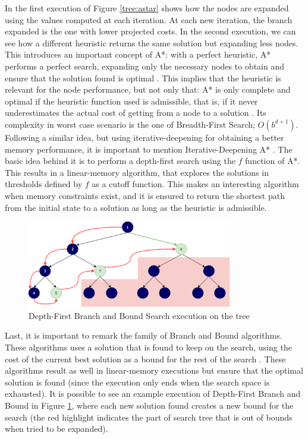 In the first execution of Figure \ref{tree:astar} shows how the nodes are
expanded using the values computed at each iteration. At each new iteration,
the branch expanded is the one with lower projected costs. In the second
execution, we can see how a different heuristic returns the same solution but
expanding less nodes. This introduces an important concept of A*: with a
perfect heuristic, A* performs a perfect search, expanding only the necessary
nodes to obtain and ensure that the solution found is optimal
\cite{dechter-1985-astar}. This implies that the heuristic is relevant for the
node performance, but not only that: A* is only complete and optimal if the
heuristic function used is admissible, that is, if it never underestimates the
actual cost of getting from a node to a solution \cite{pearl-1984-heuristics}.
Its complexity in worst case scenario is the one of Breadth-First Search;
$O(b^{d+1})$.\\

Following a similar idea, but using iterative-deepening for obtaining a better
memory performance, it is important to mention Iterative-Deepening A*
\cite{korf-1985-depth}. The basic idea behind it is to perform a depth-first
search using the $f$ function of A*. This results in a linear-memory algorithm,
that explores the solutions in thresholds defined by $f$ as a cutoff function.
This makes an interesting algorithm when memory constraints exist, and it is
ensured to return the shortest path from the initial state to a solution as
long as the heuristic is admissible.\\

\begin{figure}[ht]
\centering
\includegraphics[width=0.8\textwidth]{img/dfbnb.png}
\caption{Depth-First Branch and Bound Search execution on the tree}
\label{tree:dfbnb}
\end{figure}

Last, it is important to remark the family of Branch and Bound algorithms.
These algorithms uses a solution that is found to keep on the search, using the
cost of the current best solution as a bound for the rest of the search
\cite{zhang-1995-bnb}. These algorithms result as well in linear-memory
executions but ensure that the optimal solution is found (since the execution
only ends when the search space is exhausted). It is possible to see an example
execution of Depth-First Branch and Bound in Figure \ref{tree:dfbnb}, where
each new solution found creates a new bound for the search (the red highlight
indicates the part of search tree that is out of bounds when tried to be
expanded).\\

